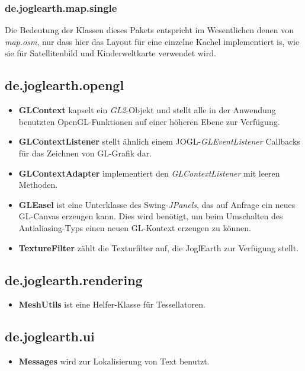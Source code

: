 \documentclass[10pt]{scrreprt}
\begin{document}
\subsubsection*{de.joglearth.map.single}
Die Bedeutung der Klassen dieses Pakets entspricht im Wesentlichen denen von \textit{map.osm}, nur dass hier das Layout für eine einzelne Kachel implementiert is, wie sie für Satellitenbild und Kinderweltkarte verwendet wird.


\subsection*{de.joglearth.opengl}
\begin{itemize}
\item \textbf{GLContext} kapselt ein \textit{GL2}-Objekt und stellt alle in der Anwendung benutzten OpenGL-Funktionen auf einer höheren Ebene zur Verfügung.
\item \textbf{GLContextListener} stellt ähnlich einem JOGL-\textit{GLEventListener} Callbacks für das Zeichnen von GL-Grafik dar.
\item \textbf{GLContextAdapter} implementiert den \textit{GLContextListener} mit leeren Methoden.
\item \textbf{GLEasel} ist eine Unterklasse des Swing-\textit{JPanels}, das auf Anfrage ein neues GL-Canvas erzeugen kann. Dies wird benötigt, um beim Umschalten des Antialiasing-Typs einen neuen GL-Kontext erzeugen zu können.
\item \textbf{TextureFilter} zählt die Texturfilter auf, die JoglEarth zur Verfügung stellt.
\end{itemize}

\subsection*{de.joglearth.rendering}
\begin{itemize}
\item \textbf{MeshUtils} ist eine Helfer-Klasse für Tessellatoren.
\end{itemize}

\subsection*{de.joglearth.ui}
\begin{itemize}
\item \textbf{Messages} wird zur Lokalisierung von Text benutzt.
\end{itemize}
\end{document}
